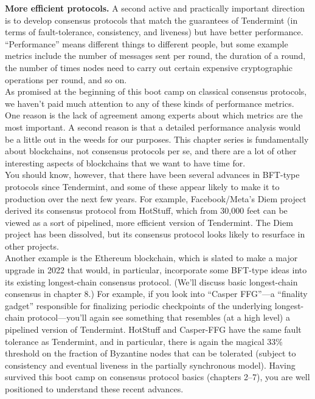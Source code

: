 \noindent
\textbf{More efficient protocols.} 
A second active and practically important direction is to
develop consensus protocols that match the guarantees of Tendermint (in terms of fault-tolerance, consistency, and liveness) but have better performance. “Performance” means
different things to different people, but some example metrics include the number of messages sent per round, the duration of a round, the number of times nodes need to carry out
certain expensive cryptographic operations per round, and so on.\\
As promised at the beginning of this boot camp on classical consensus protocols, we
haven’t paid much attention to any of these kinds of performance metrics. One reason is the
lack of agreement among experts about which metrics are the most important. A second
reason is that a detailed performance analysis would be a little out in the weeds for our
purposes. This chapter series is fundamentally about blockchains, not consensus protocols
per se, and there are a lot of other interesting aspects of blockchains that we want to have
time for.\\
You should know, however, that there have been several advances in BFT-type
protocols since Tendermint, and some of these appear likely to make it to production over the
next few years. For example, Facebook/Meta’s Diem project derived its consensus protocol
from HotStuff, which from 30,000 feet can be viewed as a sort of pipelined, more efficient
version of Tendermint. The Diem project has been dissolved, but its consensus protocol
looks likely to resurface in other projects.\\
Another example is the Ethereum blockchain, which is slated to make a major upgrade
in 2022 that would, in particular, incorporate some BFT-type ideas into its existing longest-chain consensus protocol. (We’ll discuss basic longest-chain consensus in chapter 8.) For example, if you look into “Casper FFG”—a “finality gadget” responsible for finalizing periodic checkpoints of the underlying longest-chain protocol—you’ll again see something that resembles (at a high level) a pipelined version of Tendermint.
HotStuff and Casper-FFG have the same fault tolerance as Tendermint, and in
particular, there is again the magical 33\% threshold on the fraction of Byzantine nodes that
can be tolerated (subject to consistency and eventual liveness in the partially synchronous
model). Having survived this boot camp on consensus protocol basics (chapters 2–7), you
are well positioned to understand these recent advances.\\


